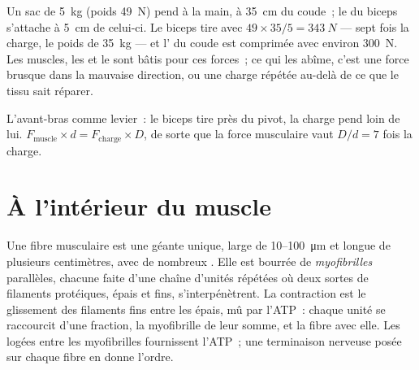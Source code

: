 \begin{example}\label{ex:g10:muscles-and-joints:bag}
Un sac de \qty{5}{kg} (poids \qty{49}{N}) pend à la main, à
\qty{35}{cm} du coude~; le  du biceps s'attache à \qty{5}{cm} de
celui-ci. Le biceps tire avec $49 \times 35/5 = \qty{343}{N}$ --- sept
fois la charge, le poids de \qty{35}{kg} --- et l' du coude
est comprimée avec environ \qty{300}{N}. Les muscles, les  et
le  sont bâtis pour ces forces~; ce qui les abîme, c'est une
force brusque dans la mauvaise direction, ou une charge répétée au-delà
de ce que le tissu sait réparer.
\end{example}

\begin{omfigure}

{\small L'avant-bras comme levier~: le biceps tire près du pivot, la
charge pend loin de lui. $F_{\text{muscle}} \times d =
F_{\text{charge}} \times D$, de sorte que la force musculaire vaut
$D/d = 7$ fois la charge.}
\end{omfigure}

\section{À l'intérieur du muscle}

\begin{proposition}\label{prop:g10:muscles-and-joints:fibre}
Une fibre musculaire est une  géante unique, large de
\num{10}--\qty{100}{\micro m} et longue de plusieurs centimètres, avec
de nombreux . Elle est bourrée de \emph{myofibrilles} parallèles,
chacune faite d'une chaîne d'unités répétées où deux sortes de
filaments protéiques, épais et fins, s'interpénètrent. La contraction
est le glissement des filaments fins entre les épais, mû par l'ATP~:
chaque unité se raccourcit d'une fraction, la myofibrille de leur
somme, et la fibre avec elle. Les  logées entre les
myofibrilles fournissent l'ATP~; une terminaison nerveuse posée sur
chaque fibre en donne l'ordre.
\end{proposition}
\admitted

